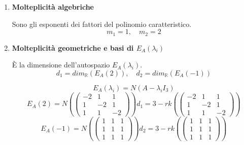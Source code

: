 \documentclass[a4paper]{article}
\theoremstyle{break}
\theoremstyle{break}
\theoremstyle{break}
\theoremstyle{break}
\begin{document}
\begin{example}
\begin{enumerate}
    \item \textbf{Molteplicità algebriche}

      \vspace{1em}
      \noindent Sono gli esponenti dei fattori del polinomio caratteristico.
      \[
      m_1 = 1, \quad m_2 = 2
      \] 
    \item \textbf{Molteplicità geometriche e basi di \( E_A(\lambda_i) \)}

      \vspace{1em}
      \noindent È la dimensione dell'autospazio \( E_A(\lambda_i) \).
      \[
      d_1 = dim_{\mathbb{R}}(E_A(2)), \quad d_2 = dim_{\mathbb{R}}(E_A(-1))
      \] 

      \[
      E_A(\lambda_i) = N(A - \lambda_i I_3)
      \] 
      \[
      E_A(2) = N \left(\begin{pmatrix} 
        -2 & 1 & 1\\
        1 & -2 & 1\\
        1 & 1 & -2
      \end{pmatrix} \right)
      d_1 = 3 - rk \left( 
        \begin{pmatrix} 
          -2 & 1 & 1\\
          1 & -2 & 1\\
          1 & 1 & -2
        \end{pmatrix} 
      \right) 
      \] 
      \[
      E_A(-1) = N \left( \begin{pmatrix} 
        1 & 1 & 1\\
        1 & 1 & 1\\
        1 & 1 & 1
      \end{pmatrix}  \right)
      d_2 = 3 - rk \left( \begin{pmatrix} 
        1 & 1 & 1\\
        1 & 1 & 1\\
        1 & 1 & 1
      \end{pmatrix}  \right)
      \] 


\end{enumerate}
\end{example}
\end{document}
